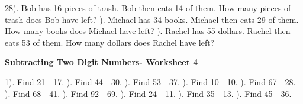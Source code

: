 \documentclass{article}%
\begin{document}
28). Bob has 16 pieces of trash. Bob then eats 14 of them. How many pieces of trash does Bob have left?%
\newline%
\newline%
). Michael has 34 books. Michael then eats 29 of them. How many books does Michael have left?%
\newline%
\newline%
). Rachel has 55 dollars. Rachel then eats 53 of them. How many dollars does Rachel have left?%
\newline%
\newline%
\newline%
\pagebreak%
\large%
\begin{center}%
\textbf{Subtracting Two Digit Numbers- Worksheet 4}%
\newline%
\end{center} \normalsize%
1). Find 21 {-} 17.%
\newline%
\newline%
). Find 44 {-} 30.%
\newline%
\newline%
). Find 53 {-} 37.%
\newline%
\newline%
). Find 10 {-} 10.%
\newline%
\newline%
). Find 67 {-} 28.%
\newline%
\newline%
). Find 68 {-} 41.%
\newline%
\newline%
). Find 92 {-} 69.%
\newline%
\newline%
). Find 24 {-} 11.%
\newline%
\newline%
). Find 35 {-} 13.%
\newline%
\newline%
). Find 45 {-} 36.%
\newline%
\end{document}
